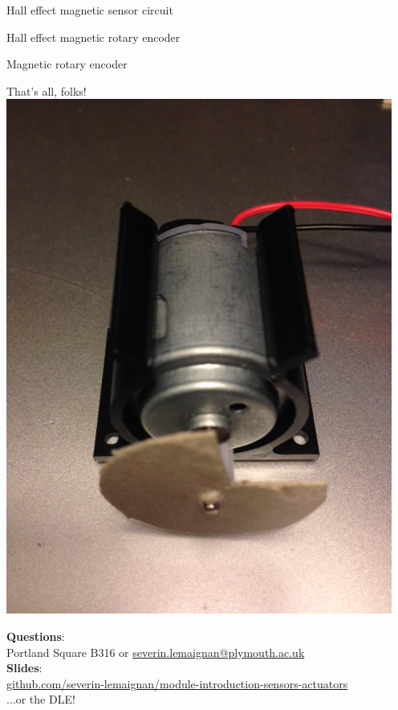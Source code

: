 \documentclass[compress]{beamer}
\makeatletter
\def\beamer@writeslidentry@miniframesoff{%
  \expandafter\beamer@ifempty\expandafter{\beamer@framestartpage}{}%
  {%
    \clearpage\beamer@notesactions%
  }
}
\newcommand*{\miniframesoff}{\let\beamer@writeslidentry=\beamer@writeslidentry@miniframesoff}
\makeatother
\begin{document}
{
    \begin{frame}{Hall effect magnetic sensor circuit}
    \end{frame}
}

{
    \begin{frame}{Hall effect magnetic rotary encoder}
    \end{frame}
}

{
    \begin{frame}{Magnetic rotary encoder}
    \end{frame}
}

\miniframesoff
\begin{frame}{}
    \begin{center}
        \Large
        That's all, folks!\\[2em]

            \includegraphics[width=0.25\linewidth]{encoder}

        \normalsize
        \textbf{Questions}:\\
        Portland Square B316 or \url{severin.lemaignan@plymouth.ac.uk} \\[1em]

        \textbf{Slides}:\\
        \href{https://github.com/severin-lemaignan/module-introduction-sensors-actuators}{\small
        github.com/severin-lemaignan/module-introduction-sensors-actuators} \\

        ...or the DLE!


    \end{center}
\end{frame}
\end{document}
